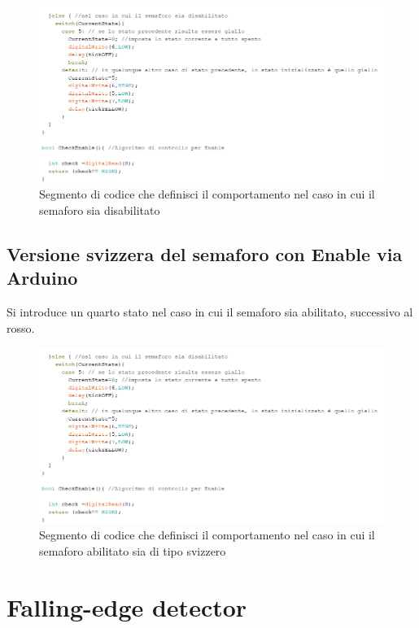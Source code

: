 \documentclass[10pt, a4paper, italian]{article}
\begin{document}
\begin{figure}[htbp]
    \centering
    \includegraphics[width=\textwidth]{Ard_disable}
    \caption{Segmento di codice che definisci il comportamento nel caso in cui il semaforo sia disabilitato
    \label{fig: code_disable}}
\end{figure}
\subsection{Versione svizzera del semaforo con Enable via Arduino}
Si introduce un quarto stato nel caso in cui il semaforo sia abilitato, successivo al rosso.
\begin{figure}[htbp]
    \centering
    \includegraphics[width=\textwidth]{Ard_disable}
    \caption{Segmento di codice che definisci il comportamento nel caso in cui il semaforo abilitato sia di tipo svizzero
    \label{fig: code_svizzero}}
\end{figure}
\section{Falling-edge detector}
\end{document}
